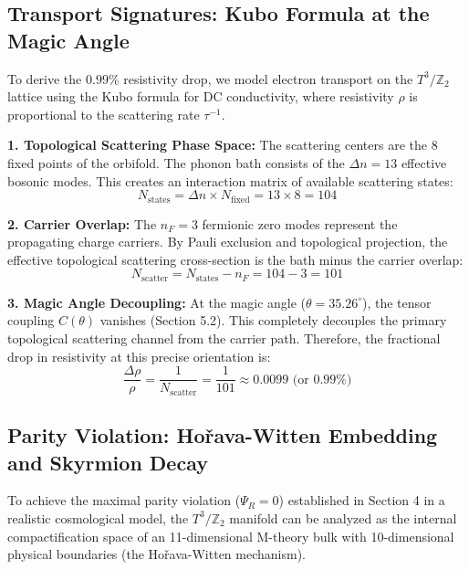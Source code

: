 \documentclass[12pt,a4paper]{article}
\newcommand{\Ztwo}{\mathbb{Z}_2}
\newcommand{\Tthree}{T^3}
\newcommand{\nF}{n_F}
\begin{document}
\subsection{Transport Signatures: Kubo Formula at the Magic Angle}

To derive the $0.99\%$ resistivity drop, we model electron transport on the $\Tthree/\Ztwo$ lattice using the Kubo formula for DC conductivity, where resistivity $\rho$ is proportional to the scattering rate $\tau^{-1}$.

\textbf{1. Topological Scattering Phase Space:}
The scattering centers are the 8 fixed points of the orbifold. The phonon bath consists of the $\Delta n = 13$ effective bosonic modes. This creates an interaction matrix of available scattering states:
\begin{equation}
N_{\text{states}} = \Delta n \times N_{\text{fixed}} = 13 \times 8 = 104
\end{equation}

\textbf{2. Carrier Overlap:}
The $\nF = 3$ fermionic zero modes represent the propagating charge carriers. By Pauli exclusion and topological projection, the effective topological scattering cross-section is the bath minus the carrier overlap:
\begin{equation}
N_{\text{scatter}} = N_{\text{states}} - \nF = 104 - 3 = 101
\end{equation}

\textbf{3. Magic Angle Decoupling:}
At the magic angle ($\theta = 35.26^\circ$), the tensor coupling $C(\theta)$ vanishes (Section 5.2). This completely decouples the primary topological scattering channel from the carrier path. Therefore, the fractional drop in resistivity at this precise orientation is:
\begin{equation}
\frac{\Delta \rho}{\rho} = \frac{1}{N_{\text{scatter}}} = \frac{1}{101} \approx 0.0099 \text{ (or } 0.99\%)
\end{equation}

\subsection{Parity Violation: Hořava-Witten Embedding and Skyrmion Decay}

To achieve the maximal parity violation ($\Psi_R = 0$) established in Section 4 in a realistic cosmological model, the $\Tthree/\Ztwo$ manifold can be analyzed as the internal compactification space of an 11-dimensional M-theory bulk with 10-dimensional physical boundaries (the Hořava-Witten mechanism).
\end{document}
